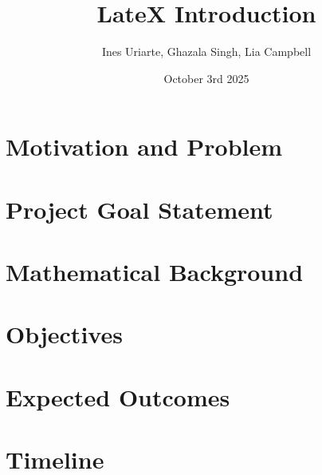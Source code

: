 \documentclass{article}
\title{LateX Introduction}
\author{Ines Uriarte, Ghazala Singh, Lia Campbell}
\date{October 3rd 2025}
\begin{document}
\maketitle

\section{Motivation and Problem}

\section{Project Goal Statement}

\section{Mathematical Background}

\section{Objectives}

\section{Expected Outcomes}

\section{Timeline}
\end{document}
